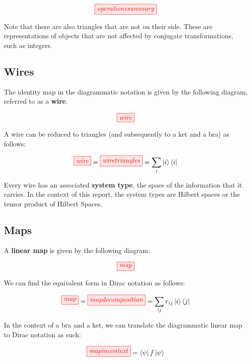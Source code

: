 \documentclass[]{article}
\begin{document}
\begin{equation}
\tikzfig{operationssummary}
\end{equation}

Note that there are also triangles that are not on their side. These are representations of objects that are not affected by conjugate transformations, such as integers.
\subsection{Wires}
\label{identity}
The identity map in the diagrammatic notation is given by the following diagram, referred to as a \textbf{wire}.

\begin{equation}
\tikzfig{wire}
\end{equation}

A wire can be reduced to triangles (and subsequently to a ket and a bra) as follows: 

\begin{equation}
\tikzfig{wire} = \tikzfig{wiretriangles} = \sum_{i}\ket{i}\bra{i}
\end{equation}

Every wire has an associated \textbf{system type}, the space of the information that it carries. In the context of this report, the system types are Hilbert spaces or the tensor product of Hilbert Spaces. 

\subsection{Maps}
\label{maps}

A \textbf{linear map} is given by the following diagram:

\begin{equation}
\tikzfig{map}
\end{equation}

We can find the equivalent form in Dirac notation as follows:

\begin{equation}
\tikzfig{map} = \tikzfig{mapdecomposition} = \sum_{ij}r_{ij}\ket{i}\bra{j}
\end{equation}

In the context of a bra and a ket, we can translate the diagrammatic linear map to Dirac notation as such:

\begin{equation}
\tikzfig{mapincontext} = \bra{\psi}f\ket{\psi}
\end{equation}
\end{document}
